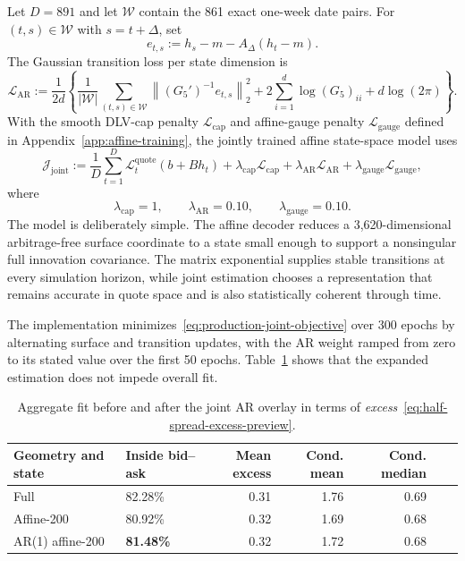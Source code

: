 \documentclass[11pt,a4paper]{article}
\DeclareRobustCommand{\eqlabel}[1]{\label{eq:#1}}                                     %
\DeclareRobustCommand{\eq}[1]{\begin{equation}\eqlabel{#1}}                           %
\DeclareRobustCommand{\eqend}{\end{equation}}                                         %
\begin{document}
Let $D=891$ and let $\mathcal W$ contain the 861 exact one-week date pairs.
For $(t,s)\in\mathcal W$ with $s=t+\Delta$, set
\eq{oneweekresidual}
  e_{t,s}:=h_s-m-A_\Delta(h_t-m).
\eqend
The Gaussian transition loss per state dimension is
\begin{equation}
  \mathcal L_{\mathrm{AR}}
  :=\frac{1}{2d}\left\{
      \frac{1}{\lvert\mathcal W\rvert}
        \sum_{(t,s)\in\mathcal W}
          \left\|(G_5')^{-1}e_{t,s}\right\|_2^2
      +2\sum_{i=1}^{d}\log (G_5)_{ii}+d\log(2\pi)
    \right\}.
  \label{eq:production-ar-loss}
\end{equation}
With the smooth DLV-cap penalty $\mathcal L_{\mathrm{cap}}$ and affine-gauge
penalty $\mathcal L_{\mathrm{gauge}}$ defined in
Appendix~\ref{app:affine-training}, the jointly trained affine state-space
model uses
\begin{equation}
  \mathcal J_{\mathrm{joint}}
  :=\frac1D\sum_{t=1}^{D}
       \mathcal L_t^{\mathrm{quote}}(b+B h_t)
     +\lambda_{\mathrm{cap}}\mathcal L_{\mathrm{cap}}
     +\lambda_{\mathrm{AR}}\mathcal L_{\mathrm{AR}}
     +\lambda_{\mathrm{gauge}}\mathcal L_{\mathrm{gauge}},
  \label{eq:production-joint-objective}
\end{equation}
where
\[
  \lambda_{\mathrm{cap}}=1,
  \qquad \lambda_{\mathrm{AR}}=0.10,
  \qquad \lambda_{\mathrm{gauge}}=0.10.
\]
The model is deliberately simple.  The affine decoder reduces a
3,620-dimensional arbitrage-free surface coordinate to a state small
enough to support a nonsingular full innovation covariance.  The 
matrix exponential supplies stable transitions at every simulation horizon,
while joint estimation chooses a representation that remains accurate in
quote space and is also statistically coherent through time.  

The implementation minimizes~\eqref{eq:production-joint-objective} over 300
epochs by alternating surface and transition updates, with the AR weight
ramped from zero to its stated value over the first 50 epochs. Table~\ref{tab:aggregate-fit2}
shows that the expanded estimation does not impede overall fit.

\begin{table}[H]
\centering
\begin{tabular}{llrrrrr}
\toprule
Geometry and state & Inside bid--ask
  & Mean excess & Cond. mean & Cond. median\\
\midrule
Full & 82.28\% & 0.31 & 1.76 & 0.69\\
Affine-200 & 80.92\% & 0.32 & 1.69 & 0.68\\
AR(1) affine-200 &\textbf{81.48\%} & 0.32 & 1.72 & 0.68\\
\bottomrule
\end{tabular}
\caption{Aggregate fit before and after the joint AR overlay in terms of \emph{excess}~\eqref{eq:half-spread-excess-preview}.}
\label{tab:aggregate-fit2}
\end{table}
\end{document}
